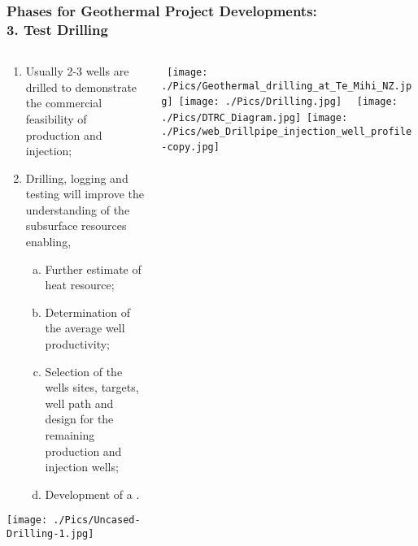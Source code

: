 \documentclass[10pt,compress,unknownkeysallowed]{beamer}
\begin{document}
\begin{frame}
 \frametitle{Phases for Geothermal Project Developments: \\ 3. Test Drilling}
  \begin{columns}
    \begin{column}[l]{0.45\linewidth}     
       \begin{enumerate}[{3.}1]\scriptsize
          \item <1-> Usually 2-3 wells are drilled to demonstrate the commercial feasibility of production and injection;
          \item <2-> Drilling, logging and testing will improve the understanding of the subsurface resources enabling,  
          \begin{enumerate}[(a)]\scriptsize
             \item<3-> Further estimate of heat resource;
             \item<4-> Determination of the average well productivity;
             \item<5-> Selection of the wells sites, targets, well path and design for the remaining production and injection wells;
             \item<6-> Development of a .
          \end{enumerate}
       \end{enumerate}
           \texttt{[image: ./Pics/Uncased-Drilling-1.jpg]}
    \end{column}
    \begin{column}[l]{0.55\linewidth} 
       \vbox{
          \hbox{
             \texttt{[image: ./Pics/Geothermal\_drilling\_at\_Te\_Mihi\_NZ.jpg]}
             \texttt{[image: ./Pics/Drilling.jpg]}
          }
          \hbox{
             \texttt{[image: ./Pics/DTRC\_Diagram.jpg]}\hspace{.53cm}
             \texttt{[image: ./Pics/web\_Drillpipe\_injection\_well\_profile-copy.jpg]}
          }
       }
    \end{column}
  \end{columns}
\end{frame}
 
 
\end{document}

